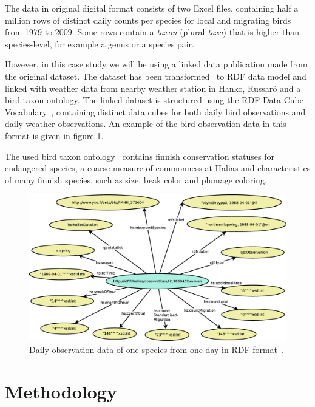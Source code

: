 \documentclass[english]{tktltiki2}
\begin{document}
The data in original digital format consists of two Excel files, containing half a million rows of distinct daily counts per species for local and migrating birds from 1979 to 2009. Some rows contain a \emph{taxon} (plural \emph{taxa}) that is higher than species-level, for example a genus or a species pair.

However, in this case study we will be using a linked data publication made from the original dataset. The dataset has been transformed~\cite{koho-hyvonen-orni-2014, koho2015gradu} to RDF data model and linked with weather data from nearby weather station in Hanko, Russarö and a bird taxon ontology.
The linked dataset is structured using the RDF Data Cube Vocabulary~\cite{w3crdfdatacube}, containing distinct data cubes for both daily bird observations and daily weather observations. An example of the bird observation data in this format is given in figure \ref{fig: havaintograafi}.

The used bird taxon ontology~\cite{koho2015gradu} contains finnish conservation statuses for endangered species, a coarse measure of commonness at Halias and characteristics of many finnish species, such as size, beak color and plumage coloring.

\begin{figure}[htb]
\centering
\includegraphics[clip=true, width=\textwidth]{havaintograafi}
\caption{Daily observation data of one species from one day in RDF format~\cite{koho2015gradu}.}
\label{fig: havaintograafi}
\end{figure}


\section{Methodology}
\end{document}
